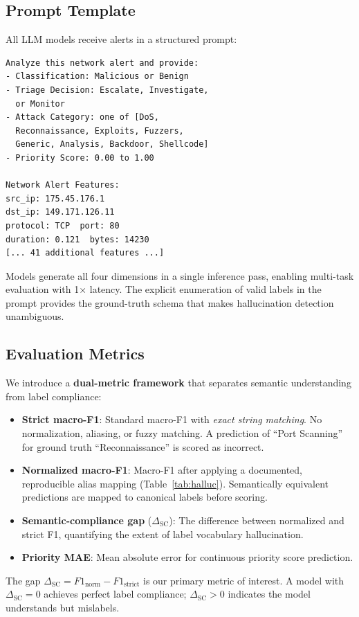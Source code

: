 \documentclass[journal]{IEEEtran}
\begin{document}
\subsection{Prompt Template}
All LLM models receive alerts in a structured prompt:
\begin{lstlisting}[caption={SOC Alert Classification Prompt},label=lst:prompt]
Analyze this network alert and provide:
- Classification: Malicious or Benign
- Triage Decision: Escalate, Investigate,
  or Monitor
- Attack Category: one of [DoS,
  Reconnaissance, Exploits, Fuzzers,
  Generic, Analysis, Backdoor, Shellcode]
- Priority Score: 0.00 to 1.00

Network Alert Features:
src_ip: 175.45.176.1
dst_ip: 149.171.126.11
protocol: TCP  port: 80
duration: 0.121  bytes: 14230
[... 41 additional features ...]
\end{lstlisting}
Models generate all four dimensions in a single inference pass, enabling multi-task evaluation with 1$\times$ latency. The explicit enumeration of valid labels in the prompt provides the ground-truth schema that makes hallucination detection unambiguous.

\subsection{Evaluation Metrics}
We introduce a \textbf{dual-metric framework} that separates semantic understanding from label compliance:
\begin{itemize}
\item \textbf{Strict macro-F1}: Standard macro-F1 with \emph{exact string matching}. No normalization, aliasing, or fuzzy matching. A prediction of ``Port Scanning'' for ground truth ``Reconnaissance'' is scored as incorrect.
\item \textbf{Normalized macro-F1}: Macro-F1 after applying a documented, reproducible alias mapping (Table~\ref{tab:halluc}). Semantically equivalent predictions are mapped to canonical labels before scoring.
\item \textbf{Semantic-compliance gap} ($\Delta_\text{SC}$): The difference between normalized and strict F1, quantifying the extent of label vocabulary hallucination.
\item \textbf{Priority MAE}: Mean absolute error for continuous priority score prediction.
\end{itemize}

The gap $\Delta_\text{SC} = F1_\text{norm} - F1_\text{strict}$ is our primary metric of interest. A model with $\Delta_\text{SC} = 0$ achieves perfect label compliance; $\Delta_\text{SC} > 0$ indicates the model understands but mislabels.
\end{document}
